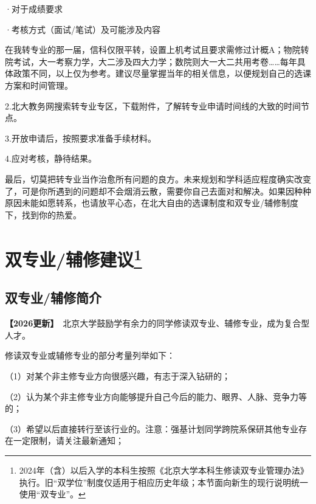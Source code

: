 \documentclass[11pt,oneside]{book}
\newcommand{\updateMark}{\textcolor{chaph}{\textbf{【2026更新】}}\ }
\begin{document}
·对于成绩要求

·考核方式（面试/笔试）及可能涉及内容

\vspace{10pt}

在我转专业的那一届，信科仅限平转，设置上机考试且要求需修过计概A；物院转院考试，大一考察力学，大二涉及四大力学；数院则大一大二共用考卷……每年具体政策不同，以上仅为参考。建议尽量掌握当年的相关信息，以便规划自己的选课方案和时间管理。

\vspace{10pt}

2.北大教务网搜索转专业专区，下载附件，了解转专业申请时间线的大致的时间节点。

\vspace{10pt}

3.开放申请后，按照要求准备手续材料。

\vspace{10pt}

4.应对考核，静待结果。

\vspace{10pt}

最后，切莫把转专业当作治愈所有问题的良方。未来规划和学科适应程度确实改变了，可是你所遇到的问题却不会烟消云散，需要你自己去面对和解决。如果因种种原因未能如愿转系，也请放平心态，在北大自由的选课制度和双专业/辅修制度下，找到你的热爱。

\newpage

\section[双专业/辅修建议]{双专业/辅修建议\footnote{2024年（含）以后入学的本科生按照《北京大学本科生修读双专业管理办法》执行。旧“双学位”制度仅适用于相应历史年级；本节面向新生的现行说明统一使用“双专业”。}}

\subsection{双专业/辅修简介}
\updateMark 北京大学鼓励学有余力的同学修读双专业、辅修专业，成为复合型人才。

\vspace{10pt}

修读双专业或辅修专业的部分考量列举如下：

（1）对某个非主修专业方向很感兴趣，有志于深入钻研的；

（2）认为某个非主修专业方向能够提升自己今后的能力、眼界、人脉、竞争力等的；

（3）希望以后直接转行至该行业的。注意：强基计划同学跨院系保研其他专业存在一定限制，请关注最新通知；
\end{document}
